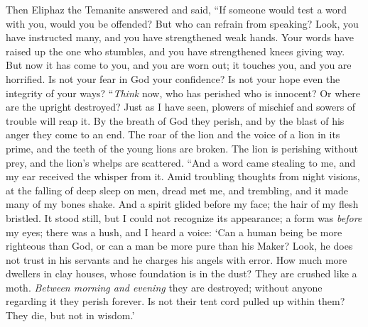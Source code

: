 \begin{biblechapter} %
 Then Eliphaz the Temanite answered and said,
\verse “If someone would test a word with you, would you be offended? 
But who can refrain from speaking?
\verse Look, you have instructed many, 
and you have strengthened weak hands.
\verse Your words have raised up the one who stumbles, 
and you have strengthened knees giving way.
\verse But now it has come to you, and you are worn out; 
it touches you, and you are horrified.
\verse Is not your fear in God your confidence? 
Is not your hope even the integrity of your ways?
\verse “\textit{Think} now, who has perished who is innocent? 
Or where are the upright destroyed?
\verse Just as I have seen, plowers of mischief 
and sowers of trouble will reap it.
\verse By the breath of God they perish, 
and by the blast of his anger they come to an end.
\verse The roar of the lion and the voice of a lion in its prime, 
and the teeth of the young lions are broken.
\verse The lion is perishing without prey, 
and the lion’s whelps are scattered.
\verse “And a word came stealing to me, 
and my ear received the whisper from it.
\verse Amid troubling thoughts from night visions, 
at the falling of deep sleep on men,
\verse dread met me, and trembling, 
and it made many of my bones shake.
\verse And a spirit glided before my face; 
the hair of my flesh bristled.
\verse It stood still, but I could not recognize its appearance; 
a form was \textit{before} my eyes; 
there was a hush, and I heard a voice:
\verse ‘Can a human being be more righteous than God, 
or can a man be more pure than his Maker?
\verse Look, he does not trust in his servants 
and he charges his angels with error.
\verse How much more dwellers in clay houses, 
whose foundation is in the dust? 
They are crushed like a moth.
\verse \textit{Between morning and evening} they are destroyed; 
without anyone regarding it they perish forever.
\verse Is not their tent cord pulled up within them? 
They die, but not in wisdom.’
\end{biblechapter}

